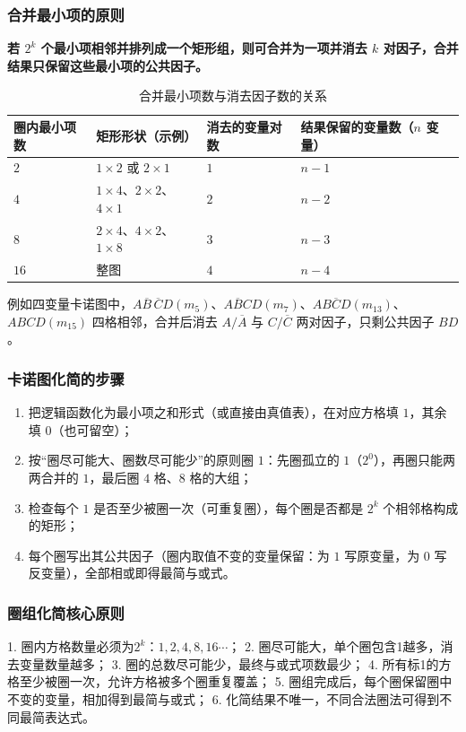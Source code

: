 \subsubsection{合并最小项的原则}
\textbf{若 $2^{k}$ 个最小项相邻并排列成一个矩形组，则可合并为一项并消去 $k$ 对因子，合并结果只保留这些最小项的公共因子。}

\begin{table}[!htbp]
    \centering
    \caption{合并最小项数与消去因子数的关系}
    \label{tab:merge_rule}
    \begin{tabular}{@{}llll@{}}
        \toprule
        圈内最小项数 & 矩形形状（示例） & 消去的变量对数 & 结果保留的变量数（$n$ 变量） \\
        \midrule
        $2$  & $1\times2$ 或 $2\times1$ & $1$ & $n-1$ \\
        $4$  & $1\times4$、$2\times2$、$4\times1$ & $2$ & $n-2$ \\
        $8$  & $2\times4$、$4\times2$、$1\times8$ & $3$ & $n-3$ \\
        $16$ & 整图 & $4$ & $n-4$ \\
        \bottomrule
    \end{tabular}
\end{table}

例如四变量卡诺图中，$A\overline{B}\,\overline{C}D(m_5)$、$A\overline{B}CD(m_7)$、$AB\overline{C}D(m_{13})$、$ABCD(m_{15})$ 四格相邻，合并后消去 $A/\overline{A}$ 与 $C/\overline{C}$ 两对因子，只剩公共因子 $BD$。

\subsubsection{卡诺图化简的步骤}
\begin{enumerate}
    \item 把逻辑函数化为最小项之和形式（或直接由真值表），在对应方格填 $1$，其余填 $0$（也可留空）；
    \item 按``圈尽可能大、圈数尽可能少''的原则圈 $1$：先圈孤立的 $1$（$2^{0}$），再圈只能两两合并的 $1$，最后圈 $4$ 格、$8$ 格的大组；
    \item 检查每个 $1$ 是否至少被圈一次（可重复圈），每个圈是否都是 $2^{k}$ 个相邻格构成的矩形；
    \item 每个圈写出其公共因子（圈内取值不变的变量保留：为 $1$ 写原变量，为 $0$ 写反变量），全部相或即得最简与或式。
\end{enumerate}

\subsubsection{圈组化简核心原则}
1. 圈内方格数量必须为$2^k$：$1,2,4,8,16\cdots$；
2. 圈尽可能大，单个圈包含1越多，消去变量数量越多；
3. 圈的总数尽可能少，最终与或式项数最少；
4. 所有标1的方格至少被圈一次，允许方格被多个圈重复覆盖；
5. 圈组完成后，每个圈保留圈中不变的变量，相加得到最简与或式；
6. 化简结果不唯一，不同合法圈法可得到不同最简表达式。

